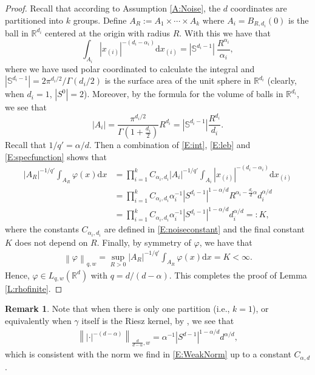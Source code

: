 \documentclass[a4paper,11pt]{article}
\numberwithin{equation}{section}
\numberwithin{equation}{section}
\theoremstyle{plain}
\theoremstyle{definition}
\newtheorem{remark}[theorem]{Remark}
\newcommand{\ud}{\ensuremath{\mathrm{d} }}
\newcommand{\Norm}[1]{\left\|  #1   \right\|}
\newcommand{\R}{\mathbb{R}}
\begin{document}
\begin{proof}
  Recall that according to Assumption \ref{A:Noise}, the $d$ coordinates are partitioned into $k$
  groups.  Define $A_R := A_1 \times \cdots \times A_k$ where $A_i = B_{R,d_i}(0)$ is the ball in
  $\R^{d_i}$ centered at the origin with radius $R$.  With this we have that
  \begin{equation}
    \label{E:int}
    \int_{A_i} |x_{(i)}|^{-(d_i-\alpha_i)} \ud x_{(i)}
    = |\mathbb{S}^{d_i - 1}|\: \dfrac{R^{\alpha_i}}{\alpha_i},
  \end{equation}
  where we have used polar coordinated to calculate the integral and
  $\left|\mathbb{S}^{d_i-1}\right| = 2\pi^{d_i / 2}/\Gamma(d_i/2)$ is the surface area of the unit
  sphere in $\R^{d_i}$ (clearly, when $d_i=1$,  $|S^0|=2$). Moreover, by the formula for the volume
  of balls in $\R^{d_i}$, we see that
  \begin{equation}
    \label{E:leb}
    |A_i| = \frac{\pi^{d_i /2}}{\Gamma\left(1+ \frac{d_i}{2}\right)} R^{d_i}
          = |\mathbb{S}^{d_i - 1}|\dfrac{R^{d_i}}{d_i}.
  \end{equation}
  Recall that $1/q' = \alpha/d$. Then a combination of \eqref{E:int}, \eqref{E:leb} and
  \eqref{E:specfunction} shows that
  \begin{align*}
    |A_R|^{-1/q'}  \int_{A_R} \varphi(x) \ud x
    & = \prod_{i=1}^k C_{\alpha_i,d_i} |A_i|^{-1/q'} \int_{A_i} |x_{(i)}|^{-(d_i-\alpha_i)} \ud x_{(i)}                       \\
    & = \prod_{i=1}^k C_{\alpha_i,d_i} \alpha_i^{-1}|S^{d_i-1}|^{1-\alpha/d} R^{\alpha_i- \frac{d_i}{d}\alpha} d_i^{\alpha/d} \\
    & = \prod_{i=1}^k C_{\alpha_i,d_i} \alpha_i^{-1}|S^{d_i-1}|^{1-\alpha/d} d_i^{\alpha/d} =: K,
  \end{align*}
  where the constants $C_{\alpha_i,d_i}$ are defined in \eqref{E:noiseconstant} and the final
  constant $K$ does not depend on $R$. Finally, by symmetry of $\varphi$, we have that
  \begin{align}
    \label{E:WeakNorm}
    \Norm{\varphi}_{q,w} = \sup_{R>0}  |A_R|^{-1/q'}  \int_{A_R} \varphi(x) \ud x = K < \infty.
  \end{align}
  Hence, $\varphi \in L_{q,w}(\R^d)$ with $q = d/(d-\alpha)$. This completes the proof of Lemma \ref{L:rhofinite}.
\end{proof}

\begin{remark}
  Note that when there is only one partition (i.e., $k=1$), or equivalently when $\gamma$ itself is
  the Riesz kernel, by \cite[(6) on p.  107]{LiebLoss01}, we see that
  \begin{align*}
    \Norm{|\cdot|^{-(d-\alpha)}}_{\frac{d}{d-\alpha},w} = \alpha^{-1} |S^{d-1}|^{1-\alpha/d} d^{\alpha/d},
  \end{align*}
  which is consistent with the norm we find in \eqref{E:WeakNorm} up to a constant $C_{\alpha,d}$.
\end{remark}
\end{document}
